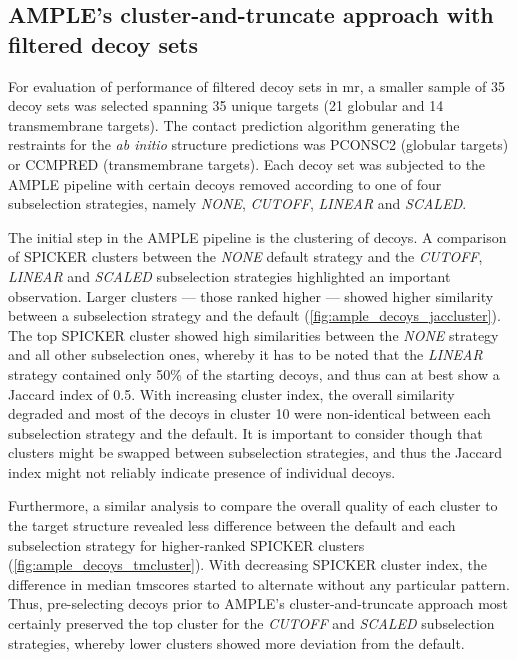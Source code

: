 \subsection{AMPLE's cluster-and-truncate approach with filtered decoy sets}
For evaluation of performance of filtered decoy sets in \gls{mr}, a smaller sample of 35 decoy sets was selected spanning 35 unique targets (21 globular and 14 transmembrane targets). The contact prediction algorithm generating the restraints for the \textit{ab initio} structure predictions was PCONSC2 (globular targets) or CCMPRED (transmembrane targets). Each decoy set was subjected to the AMPLE pipeline with certain decoys removed according to one of four subselection strategies, namely \textit{NONE}, \textit{CUTOFF}, \textit{LINEAR} and \textit{SCALED}.

The initial step in the AMPLE pipeline is the clustering of decoys. A comparison of SPICKER clusters between the \textit{NONE} default strategy and the \textit{CUTOFF}, \textit{LINEAR} and \textit{SCALED} subselection strategies highlighted an important observation. Larger clusters --- those ranked higher --- showed higher similarity between a subselection strategy and the default (\cref{fig:ample_decoys_jaccluster}). The top SPICKER cluster showed high similarities between the \textit{NONE} strategy and all other subselection ones, whereby it has to be noted that the \textit{LINEAR} strategy contained only 50\% of the starting decoys, and thus can at best show a Jaccard index of 0.5. With increasing cluster index, the overall similarity degraded and most of the decoys in cluster 10 were non-identical between each subselection strategy and the default. It is important to consider though that clusters might be swapped between subselection strategies, and thus the Jaccard index might not reliably indicate presence of individual decoys.

Furthermore, a similar analysis to compare the overall quality of each cluster to the target structure revealed less difference between the default and each subselection strategy for higher-ranked SPICKER clusters (\cref{fig:ample_decoys_tmcluster}). With decreasing SPICKER cluster index, the difference in median \gls{tmscore}s started to alternate without any particular pattern. Thus, pre-selecting decoys prior to AMPLE's cluster-and-truncate approach most certainly preserved the top cluster for the \textit{CUTOFF} and \textit{SCALED} subselection strategies, whereby lower clusters showed more deviation from the default.

